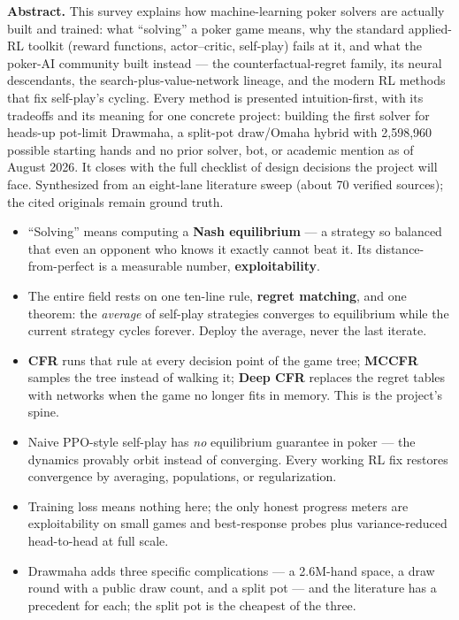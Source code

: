 \textbf{Abstract.} This survey explains how machine-learning poker solvers are actually built and trained: what ``solving'' a poker game means, why the standard applied-RL toolkit (reward functions, actor--critic, self-play) fails at it, and what the poker-AI community built instead --- the counterfactual-regret family, its neural descendants, the search-plus-value-network lineage, and the modern RL methods that fix self-play's cycling. Every method is presented intuition-first, with its tradeoffs and its meaning for one concrete project: building the first solver for heads-up pot-limit Drawmaha, a split-pot draw/Omaha hybrid with 2{,}598{,}960 possible starting hands and no prior solver, bot, or academic mention as of August 2026. It closes with the full checklist of design decisions the project will face. Synthesized from an eight-lane literature sweep (about 70 verified sources); the cited originals remain ground truth.

\begin{tldr}
\begin{itemize}
\item ``Solving'' means computing a \textbf{Nash equilibrium} --- a strategy so balanced that even an opponent who knows it exactly cannot beat it. Its distance-from-perfect is a measurable number, \textbf{exploitability}.
\item The entire field rests on one ten-line rule, \textbf{regret matching}, and one theorem: the \emph{average} of self-play strategies converges to equilibrium while the current strategy cycles forever. Deploy the average, never the last iterate.
\item \textbf{CFR} runs that rule at every decision point of the game tree; \textbf{MCCFR} samples the tree instead of walking it; \textbf{Deep CFR} replaces the regret tables with networks when the game no longer fits in memory. This is the project's spine.
\item Naive PPO-style self-play has \emph{no} equilibrium guarantee in poker --- the dynamics provably orbit instead of converging. Every working RL fix restores convergence by averaging, populations, or regularization.
\item Training loss means nothing here; the only honest progress meters are exploitability on small games and best-response probes plus variance-reduced head-to-head at full scale.
\item Drawmaha adds three specific complications --- a 2.6M-hand space, a draw round with a public draw count, and a split pot --- and the literature has a precedent for each; the split pot is the cheapest of the three.
\end{itemize}
\end{tldr}
